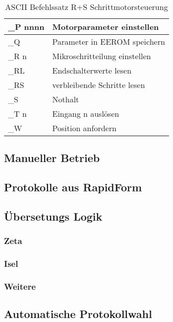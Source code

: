 \begin{table}[htb]
\begin{tabular}{|l|l|}
\rule[-1ex]{0pt}{2.5ex} \_P nnnn 	& Motorparameter einstellen                    \\ \hline 
\rule[-1ex]{0pt}{2.5ex} \_Q 		& Parameter in EEROM speichern                 \\ \hline 
\rule[-1ex]{0pt}{2.5ex} \_R n 		& Mikroschritteilung einstellen                \\ \hline 
\rule[-1ex]{0pt}{2.5ex} \_RL 		& Endschalterwerte lesen                       \\ \hline 
\rule[-1ex]{0pt}{2.5ex} \_RS  		& verbleibende Schritte lesen                  \\ \hline 
\rule[-1ex]{0pt}{2.5ex} \_S   		& Nothalt                                      \\ \hline 
\rule[-1ex]{0pt}{2.5ex} \_T n 		& Eingang n auslösen                           \\ \hline 
\rule[-1ex]{0pt}{2.5ex} \_W   		& Position anfordern                           \\ \hline 
\end{tabular} 
\caption{ASCII Befehlssatz R+S Schrittmotorsteuerung}\cite{rs:ug_stepper}
\label{tbl:ASCII_RS}
\end{table}
 \subsection{Manueller Betrieb}
\subsection{Protokolle aus RapidForm}
\subsection{Übersetungs Logik}
\subsubsection{Zeta}
\subsubsection{Isel}
\subsubsection{Weitere}
\subsection{Automatische Protokollwahl}
